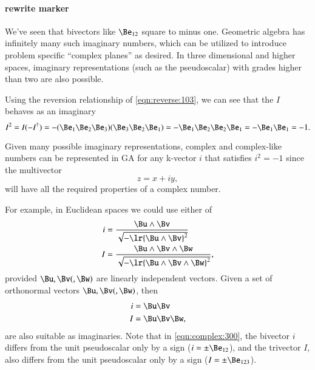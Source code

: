 \paragraph{rewrite marker}

We've seen that bivectors like \( \Be_{12} \) square to minus one.
Geometric algebra has infinitely many such imaginary numbers, which can be utilized to introduce problem specific ``complex planes'' as desired.
In three dimensional and higher spaces, imaginary representations
(such as the  pseudoscalar) with grades higher than two are also possible.

Using the reversion relationship of \cref{eqn:reverse:103}, we can see that the \( I \) behaves as an imaginary
\begin{dmath}\label{eqn:complex:3310}
I^2
=
I (-I^\dagger)
=
-
(\Be_1 \Be_2 \Be_3)(\Be_3 \Be_2 \Be_1)
=
-
\Be_1 \Be_2 \Be_2 \Be_1
=
-
\Be_1 \Be_1
=
-1.
\end{dmath}

Given many possible imaginary representations, complex and complex-like numbers can be represented in GA for any k-vector \( i \) that satisfies \( i^2 = -1 \) since the multivector
\begin{dmath}\label{eqn:complex:260}
z = x + i y,
\end{dmath}
will have all the required properties of a complex number.

For example, in Euclidean spaces we could use either of
\begin{dmath}\label{eqn:complex:280}
\begin{aligned}
i &= \frac{\Bu \wedge \Bv}{\sqrt{-\lr{\Bu\wedge\Bv}^2}} \\
I &= \frac{\Bu \wedge \Bv \wedge \Bw}{\sqrt{-\lr{\Bu\wedge\Bv\wedge \Bw}^2}},
\end{aligned}
\end{dmath}
provided \( \Bu, \Bv (,\Bw) \) are linearly independent vectors.
Given a set of orthonormal vectors \( \Bu, \Bv (,\Bw) \), then
\begin{dmath}\label{eqn:complex:300}
\begin{aligned}
i &= \Bu \Bv \\
I &= \Bu \Bv \Bw,
\end{aligned}
\end{dmath}
are also suitable as imaginaries.  Note that in \cref{eqn:complex:300}, the bivector \( i \) differs from the unit  pseudoscalar only by a sign (\( i = \pm \Be_{12} \)), and the trivector \( I \), also differs from the  unit pseudoscalar only by a sign (\( I = \pm \Be_{123} \)).

